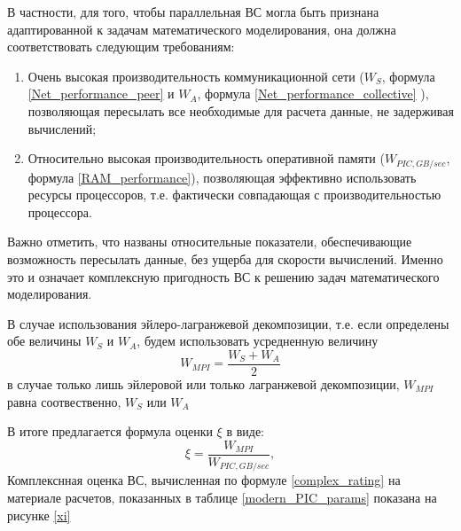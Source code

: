В частности, для того, чтобы параллельная ВС могла быть признана адаптированной к задачам математического моделирования, она должна соответствовать следующим требованиям:
\begin{enumerate}
	\item Очень высокая производительность коммуникационной сети ($W_S$, формула \ref{Net_performance_peer} и $W_A$, формула \ref{Net_performance_collective} ), позволяющая пересылать все необходимые для расчета данные, не задерживая вычислений;
	
	\item Относительно высокая производительность оперативной памяти ($W_{PIC,GB/sec}$, формула \ref{RAM_performance}), позволяющая эффективно использовать ресурсы процессоров, т.е. фактически совпадающая с производительностью процессора.  	
\end{enumerate}

Важно отметить, что названы относительные показатели, обеспечивающие возможность пересылать данные, без ущерба для скорости вычислений. Именно это и означает  комплексную пригодность ВС к решению задач математического моделирования.

В случае использования эйлеро-лагранжевой декомпозиции, т.е. если определены обе величины $W_S$ и $W_A$, будем использовать усредненную величину
\begin{equation}
W_{MPI} = \frac{W_S + W_A}{2}
\end{equation}
в случае только лишь эйлеровой или только лагранжевой декомпозиции, $W_{MPI}$ равна соотвественно, $W_S$ или $W_A$

В итоге предлагается формула оценки $\xi$ в виде:
\begin{equation}
\xi = \frac{W_{MPI}} { W_{PIC,GB/sec}}, 
\label{complex_rating}
\end{equation}
Комплекснная оценка ВС, вычисленная по формуле \ref{complex_rating}
на материале расчетов, показанных в таблице \ref{modern_PIC_params}
показана на рисунке \ref{xi}

